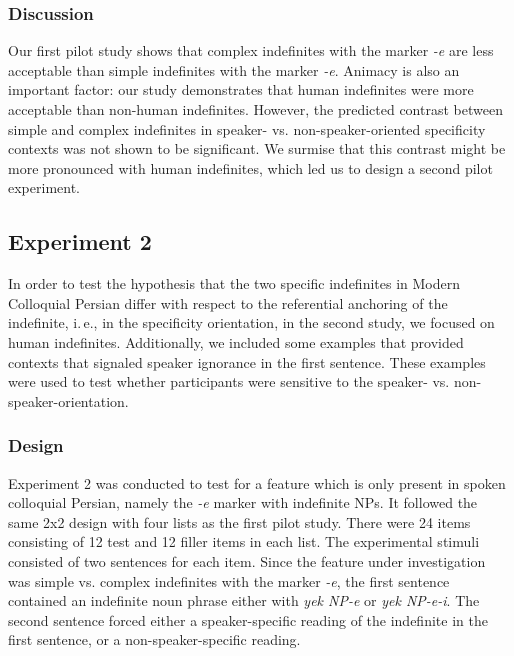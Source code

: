 \documentclass[output=paper]{langsci/langscibook}
\begin{document}
\subsubsection{Discussion}\label{4sec:513}

{
Our first pilot study shows that complex indefinites with the marker {\emph{-e}} are less acceptable than simple indefinites with the marker {\emph{-e}}. Animacy is also an important factor: our study demonstrates that human indefinites were more acceptable than non-human indefinites. However, the predicted contrast between simple and complex indefinites in speaker- vs. non-speaker-oriented specificity contexts was not shown to be significant. We surmise that this contrast might be more pronounced with human indefinites, which led us to design a second pilot experiment.
}

\subsection{Experiment 2}\label{4sec:52}
In order to test the hypothesis that the two specific indefinites in Modern Colloquial Persian differ with respect to the referential anchoring of the indefinite, i.\,e., in the specificity orientation, in the second study, we focused on human indefinites. Additionally, we included some examples that provided contexts that signaled speaker ignorance in the first sentence. These examples were used to test whether participants were sensitive to the speaker- vs. non-speaker-orientation.

\subsubsection{Design}\label{3sec:521}

Experiment 2 was conducted to test for a feature which is only present in spoken colloquial Persian, namely the {\emph{-e}} marker with indefinite NPs. It followed the same 2x2 design with four lists as the first pilot study. There were 24 items consisting of 12 test and 12 filler items in each list. The experimental stimuli consisted of two sentences for each item. Since the feature under investigation was simple vs. complex indefinites with the marker {\emph{-e}}, the first sentence contained an indefinite noun phrase either with {\emph{yek NP-e}} or {\emph{yek NP-e-i}}. The second sentence forced either a speaker-specific reading of the indefinite in the first sentence, or a non-speaker-specific reading. 
\end{document}
